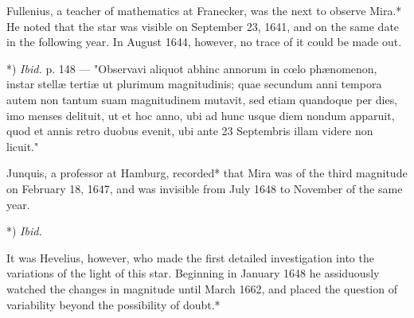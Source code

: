 \documentclass[a4paper, 12pt, oneside, polutonikogreek, english]{article}
\begin{document}
Fullenius, a teacher of mathematics at Franecker, was the next to observe Mira.* He noted that the star was visible on September 23, 1641, and on the same date in the following year. In August 1644, however, no trace of it could be made out.

*) \emph{Ibid.} p. 148 --- "Observavi aliquot abhinc annorum in cœlo phænomenon, instar stellæ tertiæ ut plurimum magnitudinis; quae secundum anni tempora autem non tantum suam magnitudinem mutavit, sed etiam quandoque per dies, imo menses delituit, ut et hoc anno, ubi ad hunc usque diem nondum apparuit, quod et annis retro duobus evenit, ubi ante 23 Septembris illam videre non licuit."

Junquis, a professor at Hamburg, recorded* that Mira was of the third magnitude on February 18, 1647, and was invisible from July 1648 to November of the same year.

*) \emph{Ibid.}

It was Hevelius, however, who made the first detailed investigation into the variations of the light of this star. Beginning in January 1648 he assiduously watched the changes in magnitude until March 1662, and placed the question of variability beyond the possibility of doubt.*
\end{document}
